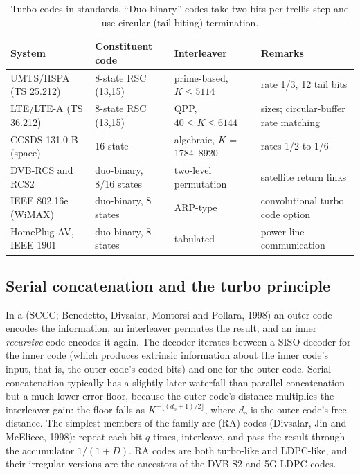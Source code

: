 \begin{table}[htbp]\centering\small
\caption{Turbo codes in standards. ``Duo-binary'' codes take two bits per trellis step and use
circular (tail-biting) termination.}
\label{tab:ch15:turbostd}
\begin{tabularx}{\linewidth}{@{}l l l >{\raggedright\arraybackslash}X@{}}
\toprule
System & Constituent code & Interleaver & Remarks\\
\midrule
UMTS/HSPA (TS 25.212) & 8-state RSC (13,15) & prime-based, $K\le5114$ & rate 1/3, 12 tail bits\\
LTE/LTE-A (TS 36.212) & 8-state RSC (13,15) & QPP, $40\le K\le6144$ & 188 sizes; circular-buffer rate matching\\
CCSDS 131.0-B (space) & 16-state & algebraic, $K$ = 1784--8920 & rates 1/2 to 1/6\\
DVB-RCS and RCS2 & duo-binary, 8/16 states & two-level permutation & satellite return links\\
IEEE 802.16e (WiMAX) & duo-binary, 8 states & ARP-type & convolutional turbo code option\\
HomePlug AV, IEEE 1901 & duo-binary, 8 states & tabulated & power-line communication\\
\bottomrule
\end{tabularx}
\end{table}

\subsection{Serial concatenation and the turbo principle}

In a  (SCCC; Benedetto, Divsalar, Montorsi and
Pollara, 1998) an outer code encodes the information, an interleaver permutes the result, and an
inner \emph{recursive} code encodes it again. The decoder iterates between a SISO decoder for the
inner code (which produces extrinsic information about the inner code's input, that is, the outer
code's coded bits) and one for the outer code. Serial concatenation typically has a slightly later
waterfall than parallel concatenation but a much lower error floor, because the outer code's
distance multiplies the interleaver gain: the floor falls as $K^{-\lfloor(d_o+1)/2\rfloor}$, where
$d_o$ is the outer code's free distance. The simplest members of the family are
 (RA) codes (Divsalar, Jin and McEliece, 1998): repeat each bit $q$ times,
interleave, and pass the result through the accumulator $1/(1+D)$. RA codes are both turbo-like and
LDPC-like, and their irregular versions are the ancestors of the DVB-S2 and 5G LDPC codes.

